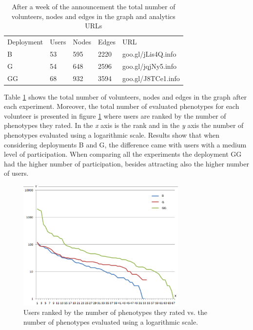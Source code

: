 \begin{table}
  \small
  \caption{After a week of the announcement the total number of volunteers, 
  nodes and edges in the graph and analytics URLs}
  \label{tab:urls} 
  \centering
  \small
  \begin{tabular}{l l l l l}
    \hline\noalign{\smallskip}
     Deployment &  Users &  Nodes &  Edges & URL \\
    \noalign{\smallskip}\hline\noalign{\smallskip}
    B   & 53 &  595   & 2220  & goo.gl/jLis4Q.info \\ \hline
    G   & 54 &  648   & 2596  & goo.gl/jqjNy5.info \\ \hline
    GG  & 68 &  932   & 3594  & goo.gl/J8TCe1.info \\ \hline
    \end{tabular}
\end{table}

Table \ref{tab:urls} shows the total number of volunteers, nodes and edges 
in the graph after each experiment. Moreover, the total number of evaluated 
phenotypes for each volunteer is presented in figure 
\ref{fig:top-ranked-participation} where users are ranked by the 
number of phenotypes they rated. In the \emph{x} axis is the rank and in the \emph{y} axis 
the number of phenotypes evaluated using a logarithmic scale. Results show that when 
considering deployments B and G, the difference came with users with a medium level of participation.
When comparing all the experiments the deployment GG had the higher
number of participation, besides attracting also the higher number of users.    

\begin{figure}[!t]
    \centering
        \includegraphics[width=3.3in]{img/comparison.png}
    \caption{Users ranked by the number of phenotypes they 
    rated vs. the number of phenotypes evaluated using a logarithmic scale. }
    \label{fig:top-ranked-participation}
\end{figure}

